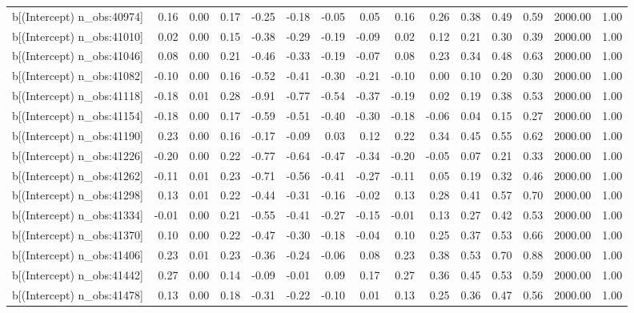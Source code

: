 \begin{table}[ht]
\begin{tabular}{rrrrrrrrrrrrrrr}
  b[(Intercept) n\_obs:40974] & 0.16 & 0.00 & 0.17 & -0.25 & -0.18 & -0.05 & 0.05 & 0.16 & 0.26 & 0.38 & 0.49 & 0.59 & 2000.00 & 1.00 \\ 
  b[(Intercept) n\_obs:41010] & 0.02 & 0.00 & 0.15 & -0.38 & -0.29 & -0.19 & -0.09 & 0.02 & 0.12 & 0.21 & 0.30 & 0.39 & 2000.00 & 1.00 \\ 
  b[(Intercept) n\_obs:41046] & 0.08 & 0.00 & 0.21 & -0.46 & -0.33 & -0.19 & -0.07 & 0.08 & 0.23 & 0.34 & 0.48 & 0.63 & 2000.00 & 1.00 \\ 
  b[(Intercept) n\_obs:41082] & -0.10 & 0.00 & 0.16 & -0.52 & -0.41 & -0.30 & -0.21 & -0.10 & 0.00 & 0.10 & 0.20 & 0.30 & 2000.00 & 1.00 \\ 
  b[(Intercept) n\_obs:41118] & -0.18 & 0.01 & 0.28 & -0.91 & -0.77 & -0.54 & -0.37 & -0.19 & 0.02 & 0.19 & 0.38 & 0.53 & 2000.00 & 1.00 \\ 
  b[(Intercept) n\_obs:41154] & -0.18 & 0.00 & 0.17 & -0.59 & -0.51 & -0.40 & -0.30 & -0.18 & -0.06 & 0.04 & 0.15 & 0.27 & 2000.00 & 1.00 \\ 
  b[(Intercept) n\_obs:41190] & 0.23 & 0.00 & 0.16 & -0.17 & -0.09 & 0.03 & 0.12 & 0.22 & 0.34 & 0.45 & 0.55 & 0.62 & 2000.00 & 1.00 \\ 
  b[(Intercept) n\_obs:41226] & -0.20 & 0.00 & 0.22 & -0.77 & -0.64 & -0.47 & -0.34 & -0.20 & -0.05 & 0.07 & 0.21 & 0.33 & 2000.00 & 1.00 \\ 
  b[(Intercept) n\_obs:41262] & -0.11 & 0.01 & 0.23 & -0.71 & -0.56 & -0.41 & -0.27 & -0.11 & 0.05 & 0.19 & 0.32 & 0.46 & 2000.00 & 1.00 \\ 
  b[(Intercept) n\_obs:41298] & 0.13 & 0.01 & 0.22 & -0.44 & -0.31 & -0.16 & -0.02 & 0.13 & 0.28 & 0.41 & 0.57 & 0.70 & 2000.00 & 1.00 \\ 
  b[(Intercept) n\_obs:41334] & -0.01 & 0.00 & 0.21 & -0.55 & -0.41 & -0.27 & -0.15 & -0.01 & 0.13 & 0.27 & 0.42 & 0.53 & 2000.00 & 1.00 \\ 
  b[(Intercept) n\_obs:41370] & 0.10 & 0.00 & 0.22 & -0.47 & -0.30 & -0.18 & -0.04 & 0.10 & 0.25 & 0.37 & 0.53 & 0.66 & 2000.00 & 1.00 \\ 
  b[(Intercept) n\_obs:41406] & 0.23 & 0.01 & 0.23 & -0.36 & -0.24 & -0.06 & 0.08 & 0.23 & 0.38 & 0.53 & 0.70 & 0.88 & 2000.00 & 1.00 \\ 
  b[(Intercept) n\_obs:41442] & 0.27 & 0.00 & 0.14 & -0.09 & -0.01 & 0.09 & 0.17 & 0.27 & 0.36 & 0.45 & 0.53 & 0.59 & 2000.00 & 1.00 \\ 
  b[(Intercept) n\_obs:41478] & 0.13 & 0.00 & 0.18 & -0.31 & -0.22 & -0.10 & 0.01 & 0.13 & 0.25 & 0.36 & 0.47 & 0.56 & 2000.00 & 1.00 \\ 

\end{tabular}
\end{table}
